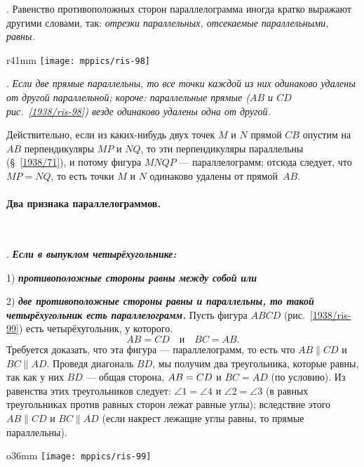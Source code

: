 {\small
\smallskip
{}.
Равенство противоположных сторон параллелограмма иногда кратко выражают другими словами, так:
\emph{отрезки параллельных, отсекаемые параллельными, равны.}

}

{

\begin{wrapfigure}{r}{41mm}
\centering
\vskip-6mm
\texttt{[image: mppics/ris-98]}
\caption{}\label{1938/ris-98}
\end{wrapfigure}

\smallskip
\mbox{.}
\emph{Если две прямые параллельны, то все точки каждой из них одинаково удалены от другой параллельной;
короче:
параллельные прямые \emph{($AB$ и $CD$ рис.~\ref{1938/ris-98})} везде одинаково удалены одна от другой.}

Действительно, если из каких-нибудь двух точек $M$ и $N$ прямой $CB$ опустим на $AB$ перпендикуляры $MP$ и $NQ$, то эти перпендикуляры параллельны (§~\ref{1938/71}), и потому фигура $MNQP$ — параллелограмм;
отсюда следует, что $MP=NQ$, то есть точки $M$ и $N$ одинаково удалены от прямой~$AB$.

}

\paragraph{Два признака параллелограммов.}\label{1938/89}\ 

\smallskip
\mbox{.}
\textbf{\emph{Если в выпуклом четырёхугольнике:}}

1) \textbf{\emph{противоположные стороны равны между собой или}}

2) \textbf{\emph{две противоположные стороны равны и параллельны, то такой четырёхугольник есть параллелограмм.}}
Пусть фигура $ABCD$ (рис.~\ref{1938/ris-99}) есть четырёхугольник, у которого.
\[AB=CD\quad \text{и}\quad BC=AB.\]
Требуется доказать, что эта фигура — параллелограмм, то есть что $AB\parallel CD$ и $BC \parallel AD$.
Проведя диагональ $BD$, мы получим два треугольника, которые равны, так как у них $BD$ — общая сторона, $AB\z=CD$ и $BC = AD$ (по условию).
Из равенства этих треугольников следует:
$\angle 1 = \angle 4 $ и $\angle 2 = \angle 3$ (в равных треугольниках против равных сторон лежат равные углы);
вследствие этого $AB \parallel CD$ и $BC\parallel AD$ (если накрест лежащие углы равны, то прямые параллельны).

\begin{wrapfigure}{o}{36mm}
\centering
\texttt{[image: mppics/ris-99]}
\caption{}\label{1938/ris-99}
\end{wrapfigure}

